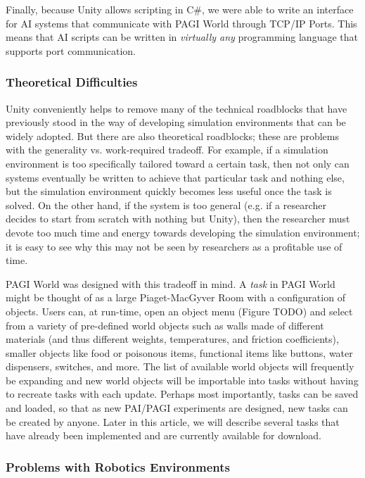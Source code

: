 Finally, because Unity allows scripting in C\#, we were able to write an interface for AI systems that communicate with PAGI World through TCP/IP Ports. This means that AI scripts can be written in \textit{virtually any} programming language that supports port communication.

\subsubsection{Theoretical Difficulties}

Unity conveniently helps to remove many of the technical roadblocks that have previously stood in the way of developing simulation environments that can be widely adopted. But there are also theoretical roadblocks; these are problems with the generality vs. work-required tradeoff. For example, if a simulation environment is too specifically tailored toward a certain task, then not only can systems eventually be written to achieve that particular task and nothing else, but the simulation environment quickly becomes less useful once the task is solved. On the other hand, if the system is too general (e.g. if a researcher decides to start from scratch with nothing but Unity), then the researcher must devote too much time and energy towards developing the simulation environment; it is easy to see why this may not be seen by researchers as a profitable use of time.

PAGI World was designed with this tradeoff in mind. A \textit{task} in PAGI World might be thought of as a large Piaget-MacGyver Room with a configuration of objects. Users can, at run-time, open an object menu (Figure TODO) and select from a variety of pre-defined world objects such as walls made of different materials (and thus different weights, temperatures, and friction coefficients), smaller objects like food or poisonous items, functional items like buttons, water dispensers, switches, and more. The list of available world objects will frequently be expanding and new world objects will be importable into tasks without having to recreate tasks with each update. Perhaps most importantly, tasks can be saved and loaded, so that as new PAI/PAGI experiments are designed, new tasks can be created by anyone. Later in this article, we will describe several tasks that have already been implemented and are currently available for download.


\subsubsection{Problems with Robotics Environments}

